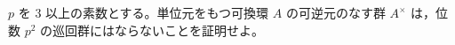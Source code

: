 \documentclass[12pt]{jlreq}
\begin{document}
$p$ を $3$ 以上の素数とする。単位元をもつ可換環 $A$ の可逆元のなす群 $A^\times$ は，位数 $p^2$ の巡回群にはならないことを証明せよ。
\end{document}
